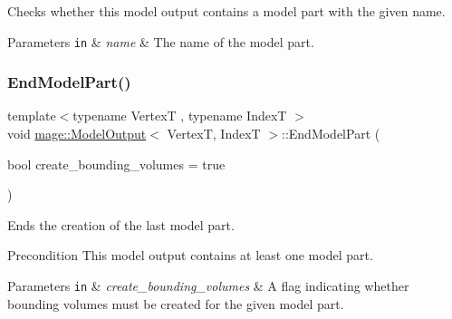 Checks whether this model output contains a model part with the given name.


\begin{DoxyParams}[1]{Parameters}
\mbox{\tt in}  & {\em name} & The name of the model part. \\
\hline
\end{DoxyParams}
\hypertarget{structmage_1_1_model_output_a24619ec445b3a122ce4b50a6f2f74158}{}\label{structmage_1_1_model_output_a24619ec445b3a122ce4b50a6f2f74158} 
\subsubsection{\texorpdfstring{End\+Model\+Part()}{EndModelPart()}}
{\footnotesize\ttfamily template$<$typename VertexT , typename IndexT $>$ \\
void \hyperlink{structmage_1_1_model_output}{mage\+::\+Model\+Output}$<$ VertexT, IndexT $>$\+::End\+Model\+Part (\begin{DoxyParamCaption}\item[{bool}]{create\+\_\+bounding\+\_\+volumes = {\ttfamily true} }\end{DoxyParamCaption})\hspace{0.3cm}{\ttfamily [noexcept]}}

Ends the creation of the last model part.

\begin{DoxyPrecond}{Precondition}
This model output contains at least one model part. 
\end{DoxyPrecond}

\begin{DoxyParams}[1]{Parameters}
\mbox{\tt in}  & {\em create\+\_\+bounding\+\_\+volumes} & A flag indicating whether bounding volumes must be created for the given model part. \\
\hline
\end{DoxyParams}
\hypertarget{structmage_1_1_model_output_a5d206619319fed85a4add63ee0532cac}{}\label{structmage_1_1_model_output_a5d206619319fed85a4add63ee0532cac} 
